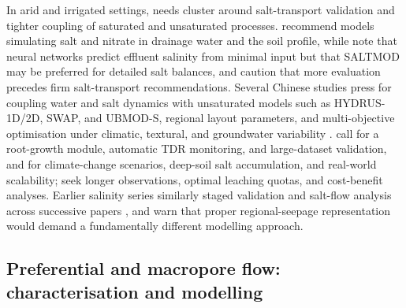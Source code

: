 \documentclass[11pt]{article}
\begin{document}
In arid and irrigated settings, needs cluster around salt-transport validation
and tighter coupling of saturated and unsaturated processes.
\textcite{Ebrahimian2015} recommend models simulating salt and nitrate in
drainage water and the soil profile, while \textcite{Sarangi2006} note that
neural networks predict effluent salinity from minimal input but that SALTMOD
may be preferred for detailed salt balances, and \textcite{Hirekhan2007} caution
that more evaluation precedes firm salt-transport recommendations. Several
Chinese studies press for coupling water and salt dynamics with unsaturated
models such as HYDRUS-1D/2D, SWAP, and UBMOD-S, regional layout parameters, and
multi-objective optimisation under climatic, textural, and groundwater
variability \parencite{Han2025,Wang2025c,Wang2024c}. \textcite{Liu2022} call for
a root-growth module, automatic TDR monitoring, and large-dataset validation,
and \textcite{Liu2026} for climate-change scenarios, deep-soil salt
accumulation, and real-world scalability; \textcite{Guo2025} seek longer
observations, optimal leaching quotas, and cost-benefit analyses. Earlier
salinity series similarly staged validation and salt-flow analysis across
successive papers \parencite{KARAJEH1994}, and \textcite{Kelleners2000} warn
that proper regional-seepage representation would demand a fundamentally
different modelling approach.

\subsection{Preferential and macropore flow: characterisation and modelling}
\end{document}
